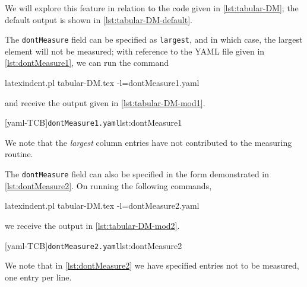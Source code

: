  \begin{example}
 We will explore this feature in relation to the code given in \cref{lst:tabular-DM}; the
 default output is shown in \cref{lst:tabular-DM-default}. %

 \begin{cmhtcbraster}[raster left skip=-1.5cm,]
 \end{cmhtcbraster}

 The \texttt{dontMeasure} field can be specified as \texttt{largest}, and in which case,
 the largest element will not be measured; with reference to the YAML file given in
 \cref{lst:dontMeasure1}, we can run the command 

 \begin{commandshell} 
latexindent.pl tabular-DM.tex -l=dontMeasure1.yaml
\end{commandshell}

 and receive the output given in \cref{lst:tabular-DM-mod1}.

 \begin{cmhtcbraster}
  [yaml-TCB]{\texttt{dontMeasure1.yaml}}{lst:dontMeasure1}
 \end{cmhtcbraster}

 We note that the \emph{largest} column entries have not contributed to the measuring
 routine.
 \end{example}

 \begin{example}
 The \texttt{dontMeasure} field can also be specified in the form demonstrated in
 \cref{lst:dontMeasure2}. On running the following commands, 

 \begin{commandshell} 
latexindent.pl tabular-DM.tex -l=dontMeasure2.yaml
\end{commandshell}

 we receive the output in \cref{lst:tabular-DM-mod2}. 

 \begin{cmhtcbraster}
  [yaml-TCB]{\texttt{dontMeasure2.yaml}}{lst:dontMeasure2}
 \end{cmhtcbraster}

 We note that in \cref{lst:dontMeasure2} we have specified entries not to be measured,
 one entry per line.
 \end{example}


